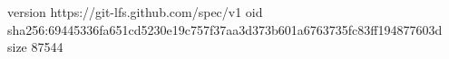 version https://git-lfs.github.com/spec/v1
oid sha256:69445336fa651cd5230e19c757f37aa3d373b601a6763735fc83ff194877603d
size 87544
